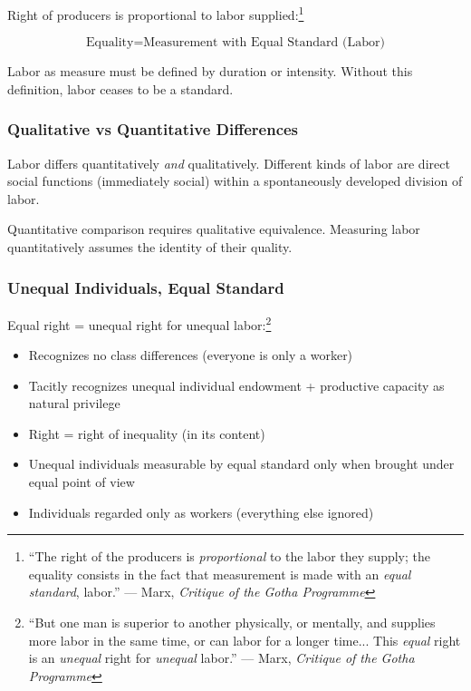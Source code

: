\documentclass[12pt,a4paper]{article}
\begin{document}
Right of producers is proportional to labor supplied:\footnote{``The right of the producers is \textit{proportional} to the labor they supply; the equality consists in the fact that measurement is made with an \textit{equal standard}, labor.'' --- Marx, \textit{Critique of the Gotha Programme}}

\begin{equation}
\text{Equality} = \text{Measurement with Equal Standard (Labor)}
\end{equation}

Labor as measure must be defined by duration or intensity. Without this definition, labor ceases to be a standard.

\subsubsection{Qualitative vs Quantitative Differences}

Labor differs quantitatively \textit{and} qualitatively. Different kinds of labor are direct social functions (immediately social) within a spontaneously developed division of labor.

Quantitative comparison requires qualitative equivalence. Measuring labor quantitatively assumes the identity of their quality.

\subsubsection{Unequal Individuals, Equal Standard}

Equal right = unequal right for unequal labor:\footnote{``But one man is superior to another physically, or mentally, and supplies more labor in the same time, or can labor for a longer time... This \textit{equal} right is an \textit{unequal} right for \textit{unequal} labor.'' --- Marx, \textit{Critique of the Gotha Programme}}

\begin{itemize}
\item Recognizes no class differences (everyone is only a worker)
\item Tacitly recognizes unequal individual endowment + productive capacity as natural privilege
\item Right = right of inequality (in its content)
\item Unequal individuals measurable by equal standard only when brought under equal point of view
\item Individuals regarded only as workers (everything else ignored)
\end{itemize}
\end{document}
